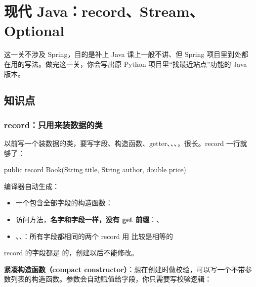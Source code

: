 \chapter{现代 Java：record、Stream、Optional}

这一关不涉及 Spring，目的是补上 Java 课上一般不讲、但 Spring 项目里到处都在用的写法。做完这一关，你会写出原 Python 项目里“找最近站点”功能的 Java 版本。


\section{知识点}

\subsection{record：只用来装数据的类}

以前写一个装数据的类，要写字段、构造函数、getter、、、，很长。record 一行就够了：

\begin{java}
public record Book(String title, String author, double price) {}
\end{java}

编译器自动生成：

\begin{itemize}
  \item 一个包含全部字段的构造函数：
  \item 访问方法，\textbf{名字和字段一样，没有 get 前缀}：、
  \item {}、、：所有字段都相同的两个 record 用  比较是相等的
\end{itemize}

record 的字段都是  的，创建以后不能修改。

\textbf{紧凑构造函数（compact constructor）}：想在创建时做校验，可以写一个不带参数列表的构造函数。参数会自动赋值给字段，你只需要写校验逻辑：

